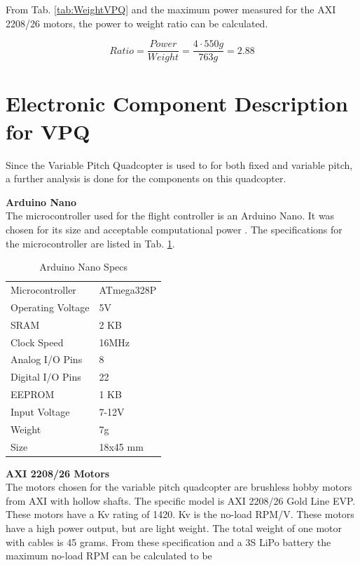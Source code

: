 From Tab. \ref{tab:WeightVPQ} and the maximum power measured for the AXI 2208/26 motors, the power to weight ratio can be calculated.

\begin{equation}
    Ratio = \frac{Power}{Weight} = \frac{4\cdot550g}{763g}=2.88
\end{equation}

\newpage

\section{Electronic Component Description for VPQ}
Since the Variable Pitch Quadcopter is used to for both fixed and variable pitch, a further analysis is done for the components on this quadcopter.\bigskip

\textbf{Arduino Nano}\\
The microcontroller used for the flight controller is an Arduino Nano. It was chosen for its size and acceptable computational power \cite{Arduino}. The specifications for the microcontroller are listed in Tab. \ref{tab:nanospecs}.

\begin{table}[H]
    \begin{center}
    \caption{Arduino Nano Specs} 
    \label{tab:nanospecs} 
        \begin{tabular}{|l|l|}
            \hline 
                Microcontroller & ATmega328P\\
                Operating Voltage & 5V \\
                SRAM & 2 KB\\
                Clock Speed & 16MHz \\
                Analog I/O Pins & 8\\
                Digital I/O Pins & 22\\
                EEPROM & 1 KB\\
                Input Voltage & 7-12V\\
                Weight & 7g\\
                Size & 18x45 mm\\
            \hline
        \end{tabular}
    \end{center}
\end{table}\bigskip


\textbf{AXI 2208/26 Motors}\\
The motors chosen for the variable pitch quadcopter are brushless hobby motors from AXI with hollow shafts. The specific model is AXI 2208/26 Gold Line EVP. These motors have a Kv rating of 1420. Kv is the no-load RPM/V. These motors have a high power output, but are light weight. The total weight of one motor with cables is 45 grams. From these specification and a 3S LiPo battery the maximum no-load RPM can be calculated to be

